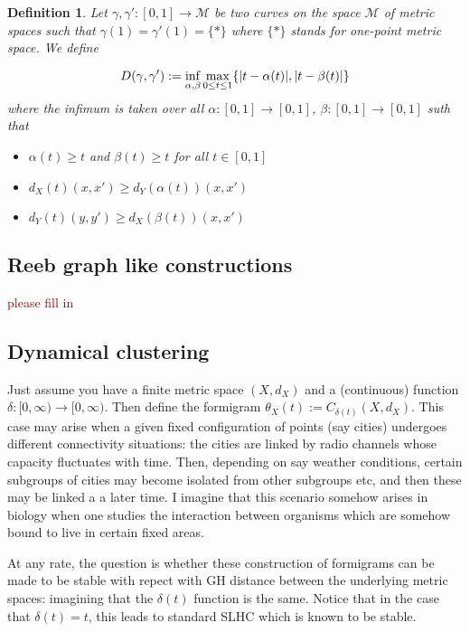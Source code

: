 \documentclass[a4paper,12pt]{article}
\newtheorem{definition}{Definition}[section]
\newcommand{\facundo}[1]                {{ \textcolor{darkred} {#1}}}
\DeclarePairedDelimiter{\abs}{\lvert}{\rvert}
\begin{document}
\begin{definition} Let $\gamma, \gamma':[0,1]\rightarrow \mathcal{M}$ be two curves on the space $\mathcal{M}$ of metric spaces such that $\gamma(1)=\gamma'(1)=\{*\}$ where $\{*\}$ stands for one-point metric space.
We define 

$$D(\gamma, \gamma'):=\inf_{\alpha,\beta}\max_{0\leq t\leq 1}\{\abs{t-\alpha(t)}, \abs{t-\beta(t)}\}$$
where the infimum is taken over all $\alpha:[0,1]\rightarrow [0,1]$, $\beta:[0,1]\rightarrow [0,1]$ suth that 

\begin{itemize}
	\item $\alpha(t)\geq t$ and $\beta(t)\geq t$ for all $t\in[0,1]$
	\item $d_X(t)(x,x')\geq d_Y(\alpha(t))(x,x')$
	\item $d_Y(t)(y,y')\geq d_X(\beta(t))(x,x')$
\end{itemize}
	
	\nocite{*}
	

\end{definition}

\subsection{Reeb graph like constructions}
\facundo{please fill in}

\subsection{Dynamical clustering}
Just assume you have a finite metric space $(X,d_X)$ and a (continuous) function $\delta:[0,\infty) \rightarrow [0,\infty)$. Then define the formigram $\theta_X(t):= C_{\delta(t)}(X,d_X)$. This case may arise when a given fixed configuration of points (say cities) undergoes different connectivity situations: the cities are linked by radio channels whose capacity fluctuates with time. Then, depending on say weather conditions, certain subgroups of cities may become isolated from other subgroups etc, and then these may be linked a a later time. I imagine that this scenario somehow arises in biology when one studies the interaction between organisms which are somehow bound to live in certain fixed areas.

At any rate, the question is whether these construction of formigrams can be made to be stable with repect with GH distance between the underlying metric spaces: imagining that the $\delta(t)$ function is the same. Notice that in the case that $\delta(t) =  t$, this leads to standard SLHC which is known to be stable.
\end{document}
